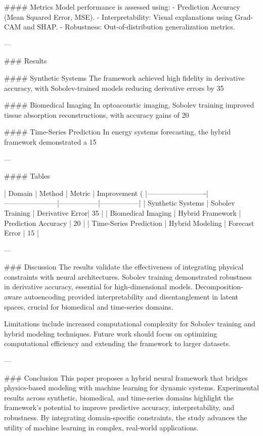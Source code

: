 #### Metrics  
Model performance is assessed using:  
- Prediction Accuracy (Mean Squared Error, MSE).  
- Interpretability: Visual explanations using Grad-CAM and SHAP.  
- Robustness: Out-of-distribution generalization metrics.  

---

### Results  

#### Synthetic Systems  
The framework achieved high fidelity in derivative accuracy, with Sobolev-trained models reducing derivative errors by 35%

#### Biomedical Imaging  
In optoacoustic imaging, Sobolev training improved tissue absorption reconstructions, with accuracy gains of 20%

#### Time-Series Prediction  
In energy systems forecasting, the hybrid framework demonstrated a 15%

---

#### Tables  

| Domain                  | Method                | Metric          | Improvement (%
|-------------------------|-----------------------|-----------------|-----------------|  
| Synthetic Systems       | Sobolev Training     | Derivative Error| 35              |  
| Biomedical Imaging      | Hybrid Framework     | Prediction Accuracy | 20          |  
| Time-Series Prediction  | Hybrid Modeling      | Forecast Error  | 15              |  

---

### Discussion  
The results validate the effectiveness of integrating physical constraints with neural architectures. Sobolev training demonstrated robustness in derivative accuracy, essential for high-dimensional models. Decomposition-aware autoencoding provided interpretability and disentanglement in latent spaces, crucial for biomedical and time-series domains.  

Limitations include increased computational complexity for Sobolev training and hybrid modeling techniques. Future work should focus on optimizing computational efficiency and extending the framework to larger datasets.  

---

### Conclusion  
This paper proposes a hybrid neural framework that bridges physics-based modeling with machine learning for dynamic systems. Experimental results across synthetic, biomedical, and time-series domains highlight the framework’s potential to improve predictive accuracy, interpretability, and robustness. By integrating domain-specific constraints, the study advances the utility of machine learning in complex, real-world applications.  

